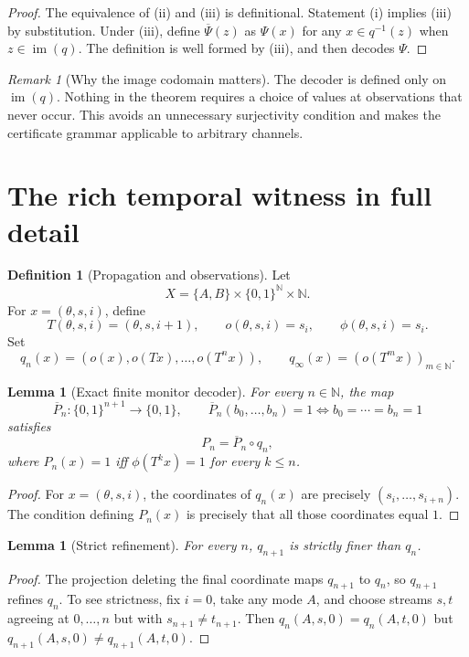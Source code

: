 \documentclass[11pt]{article}
\newcommand{\Bbits}{\ensuremath{\{0,1\}}}
\newcommand{\im}{\ensuremath{\operatorname{im}}}
\theoremstyle{plain}
\newtheorem{lemma}[theorem]{Lemma}
\theoremstyle{definition}
\newtheorem{definition}[theorem]{Definition}
\theoremstyle{remark}
\newtheorem{remark}[theorem]{Remark}
\begin{document}
\begin{proof}
The equivalence of (ii) and (iii) is definitional.  Statement (i) implies (iii)
by substitution.  Under (iii), define $\overline\Psi(z)$ as $\Psi(x)$ for any
$x\in q^{-1}(z)$ when $z\in\im(q)$.  The definition is well formed by (iii), and
then decodes $\Psi$.
\end{proof}

\begin{remark}[Why the image codomain matters]
The decoder is defined only on $\im(q)$.  Nothing in the theorem requires a
choice of values at observations that never occur.  This avoids an unnecessary
surjectivity condition and makes the certificate grammar applicable to arbitrary
channels.
\end{remark}

\section{The rich temporal witness in full detail}
\label{sec:temporal}

\begin{definition}[Propagation and observations]
Let
\[
X=\{A,B\}\times\Bbits^{\mathbb N}\times\mathbb N.
\]
For $x=(\theta,s,i)$, define
\[
T(\theta,s,i)=(\theta,s,i+1),\qquad
 o(\theta,s,i)=s_i,\qquad
 \phi(\theta,s,i)=s_i.
\]
Set
\[
q_n(x)=(o(x),o(Tx),\ldots,o(T^nx)),
\qquad
q_\infty(x)=(o(T^mx))_{m\in\mathbb N}.
\]
\end{definition}

\begin{lemma}[Exact finite monitor decoder]
For every $n\in\mathbb N$, the map
\[
\overline P_n:\Bbits^{n+1}\to\Bbits,
\qquad
\overline P_n(b_0,\ldots,b_n)=1
\Longleftrightarrow b_0=\cdots=b_n=1
\]
satisfies
\[
P_n=\overline P_n\circ q_n,
\]
where $P_n(x)=1$ iff $\phi(T^k x)=1$ for every $k\leq n$.
\end{lemma}

\begin{proof}
For $x=(\theta,s,i)$, the coordinates of $q_n(x)$ are precisely
$(s_i,\ldots,s_{i+n})$.  The condition defining $P_n(x)$ is precisely that all
those coordinates equal $1$.
\end{proof}

\begin{lemma}[Strict refinement]
For every $n$, $q_{n+1}$ is strictly finer than $q_n$.
\end{lemma}

\begin{proof}
The projection deleting the final coordinate maps $q_{n+1}$ to $q_n$, so
$q_{n+1}$ refines $q_n$.  To see strictness, fix $i=0$, take any mode $A$, and
choose streams $s,t$ agreeing at $0,\ldots,n$ but with $s_{n+1}\ne t_{n+1}$.
Then $q_n(A,s,0)=q_n(A,t,0)$ but
$q_{n+1}(A,s,0)\ne q_{n+1}(A,t,0)$.
\end{proof}
\end{document}
